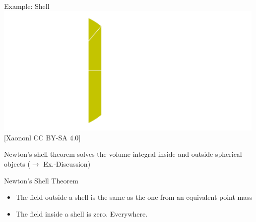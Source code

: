 \begin{frame}
\begin{PointSix}{Example: Shell}
  \includegraphics[width=0.99\textwidth]{Figures/Gravity/Exported/Shell-diag_reversed_CCBYSA4_0_Xaonon.png}
  \tiny [Xaononl CC BY-SA 4.0]

  \small Newton's shell theorem solves the volume integral inside and outside spherical objects ($\rightarrow$ Ex.-Discussion)
\end{PointSix}

\end{frame}

\begin{frame}
\begin{PointSix}{Newton's Shell Theorem}
\small
 \begin{itemize}
    \item The field outside a shell is the same as the one from an equivalent point mass
    \item The field inside a shell is zero. Everywhere.
 \end{itemize}
\end{PointSix}
\end{frame}

